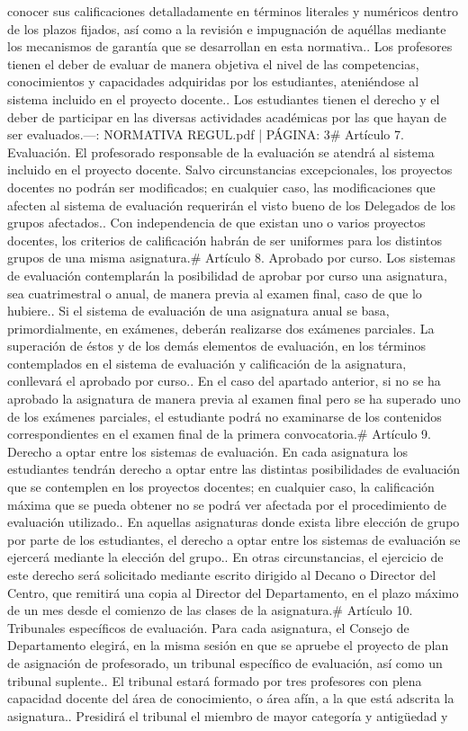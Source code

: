\documentclass{article}
\begin{document}
\begin{itemize}
{{{{conocer sus calificaciones detalladamente en términos literales y numéricos dentro de los plazos fijados, así como a la revisión e impugnación de aquéllas mediante los mecanismos de garantía que se desarrollan en esta normativa.\n{}. Los profesores tienen el deber de evaluar de manera objetiva el nivel de las competencias, conocimientos y capacidades adquiridas por los estudiantes, ateniéndose al sistema incluido en el proyecto docente.\n{}. Los estudiantes tienen el derecho y el deber de participar en las diversas actividades académicas por las que hayan de ser evaluados.\n\n---\n\nFUENTE: NORMATIVA REGUL.pdf | PÁGINA: 3\n# Artículo 7. Evaluación\n{}. El profesorado responsable de la evaluación se atendrá al sistema incluido en el proyecto docente. Salvo circunstancias excepcionales, los proyectos docentes no podrán ser modificados; en cualquier caso, las modificaciones que afecten al sistema de evaluación requerirán el visto bueno de los Delegados de los grupos afectados.\n{}. Con independencia de que existan uno o varios proyectos docentes, los criterios de calificación habrán de ser uniformes para los distintos grupos de una misma asignatura.\n\n# Artículo 8. Aprobado por curso\n{}. Los sistemas de evaluación contemplarán la posibilidad de aprobar por curso una asignatura, sea cuatrimestral o anual, de manera previa al examen final, caso de que lo hubiere.\n{}. Si el sistema de evaluación de una asignatura anual se basa, primordialmente, en exámenes, deberán realizarse dos exámenes parciales. La superación de éstos y de los demás elementos de evaluación, en los términos contemplados en el sistema de evaluación y calificación de la asignatura, conllevará el aprobado por curso.\n{}. En el caso del apartado anterior, si no se ha aprobado la asignatura de manera previa al examen final pero se ha superado uno de los exámenes parciales, el estudiante podrá no examinarse de los contenidos correspondientes en el examen final de la primera convocatoria.\n\n# Artículo 9. Derecho a optar entre los sistemas de evaluación\n{}. En cada asignatura los estudiantes tendrán derecho a optar entre las distintas posibilidades de evaluación que se contemplen en los proyectos docentes; en cualquier caso, la calificación máxima que se pueda obtener no se podrá ver afectada por el procedimiento de evaluación utilizado.\n{}. En aquellas asignaturas donde exista libre elección de grupo por parte de los estudiantes, el derecho a optar entre los sistemas de evaluación se ejercerá mediante la elección del grupo.\n{}. En otras circunstancias, el ejercicio de este derecho será solicitado mediante escrito dirigido al Decano o Director del Centro, que remitirá una copia al Director del Departamento, en el plazo máximo de un mes desde el comienzo de las clases de la asignatura.\n\n# Artículo 10. Tribunales específicos de evaluación\n{}. Para cada asignatura, el Consejo de Departamento elegirá, en la misma sesión en que se apruebe el proyecto de plan de asignación de profesorado, un tribunal específico de evaluación, así como un tribunal suplente.\n{}. El tribunal estará formado por tres profesores con plena capacidad docente del área de conocimiento, o área afín, a la que está adscrita la asignatura.\n{}. Presidirá el tribunal el miembro de mayor categoría y antigüedad y }}}}
\end{itemize}
\end{document}

